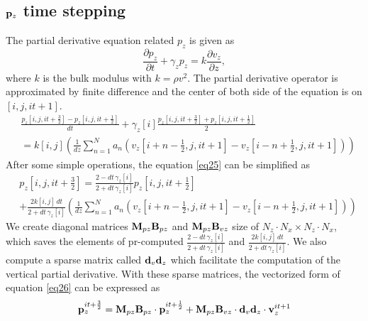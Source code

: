 \documentclass[revised,endfloat]{geophysics}
\begin{document}
\subsection{${\bf p}_z$ time stepping}
The partial derivative equation related $p_z$ is given as
\begin{equation}
\frac{\partial p_z}{\partial t} + \gamma_z p_z = k \frac{\partial v_z}{\partial z},
\label{eq24}
\end{equation}
where $k$ is the bulk modulus with $k = \rho v^2$.
The partial derivative operator is approximated by finite difference and the center of both side of the equation is on $[i,j,it+1]$. 
\begin{equation}
\begin{split}
&\frac{p_z[i,j,it+\frac{3}{2}] - p_z[i,j,it+\frac{1}{2}]}{dt} + \gamma_z[i]
\frac{p_z[i,j,it+\frac{3}{2}] + p_z[i,j,it+\frac{1}{2}]}{2} \\
& = k[i,j]  \left( \frac{1}{dz} \sum_{n=1}^N  a_n \left(v_z[i+n-\frac{1}{2},j,it+1] - v_z[i-n+\frac{1}{2},j,it+1]\right) \right)
\end{split}
\label{eq25}
\end{equation}
After some simple operations, the equation \ref{eq25} can be simplified as
\begin{equation}
\begin{split}
& p_z[i,j,it+\frac{3}{2}] = \frac{2-dt \, \gamma_z[i]}{2+dt \, \gamma_z[i]} p_z[i,j,it+\frac{1}{2}]  \\
& + \frac{2k[i,j] \, dt}{2+dt \, \gamma_z[i] } \left(\frac{1}{dz} \sum_{n=1}^N  a_n \left( v_z[i+n-\frac{1}{2},j,it+1] - v_z[i-n+\frac{1}{2},j,it+1] \right)  \right)
\end{split}
\label{eq26}
\end{equation}
We create diagonal matrices ${\bf M}_{pz}{\bf B}_{pz}$ and ${\bf M}_{pz}{\bf B}_{vz}$ size of $N_z \cdot N_x \times N_z \cdot N_x$, which saves the elements of pr-computed $\frac{2- dt\, \gamma_z[i]}{2+ dt\, \gamma_z[i]}$ and $\frac{2k[i,j] \, dt}{2+ dt\, \gamma_z[i]}$. We also compute a sparse matrix called ${\bf d}_v{\bf d}_z$ which facilitate the computation of the vertical partial derivative. With these sparse matrices, the vectorized form of equation \ref{eq26} can be expressed as
\begin{equation}
{\bf p}_z^{it+\frac{3}{2}} = {\bf M}_{pz}{\bf B}_{pz}  \cdot {\bf p}_z^{it+\frac{1}{2}} +  {\bf M}_{pz}{\bf B}_{vz} \cdot {\bf d}_v{\bf d}_z \cdot {\bf v}_z^{it+1}
\label{eq27}
\end{equation}
\end{document}
